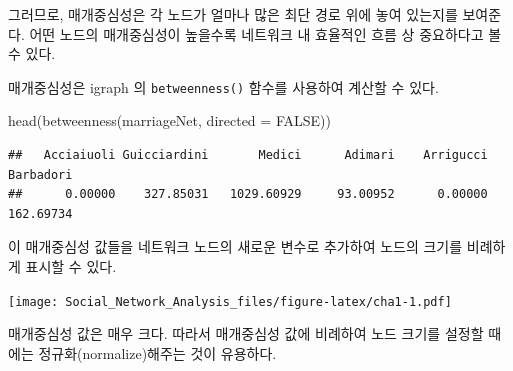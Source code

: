 \documentclass[
]{book}
\newenvironment{Shaded}{\begin{snugshade}}{\end{snugshade}}
\newcommand{\AttributeTok}[1]{\textcolor[rgb]{0.77,0.63,0.00}{#1}}
\newcommand{\CommentTok}[1]{\textcolor[rgb]{0.56,0.35,0.01}{\textit{#1}}}
\newcommand{\ConstantTok}[1]{\textcolor[rgb]{0.00,0.00,0.00}{#1}}
\newcommand{\DecValTok}[1]{\textcolor[rgb]{0.00,0.00,0.81}{#1}}
\newcommand{\FunctionTok}[1]{\textcolor[rgb]{0.00,0.00,0.00}{#1}}
\newcommand{\NormalTok}[1]{#1}
\newcommand{\OtherTok}[1]{\textcolor[rgb]{0.56,0.35,0.01}{#1}}
\newcommand{\SpecialCharTok}[1]{\textcolor[rgb]{0.00,0.00,0.00}{#1}}
\newcommand{\StringTok}[1]{\textcolor[rgb]{0.31,0.60,0.02}{#1}}
\begin{document}
그러므로, 매개중심성은 각 노드가 얼마나 많은 최단 경로 위에 놓여 있는지를 보여준다. 어떤 노드의 매개중심성이 높을수록 네트워크 내 효율적인 흐름 상 중요하다고 볼 수 있다.

매개중심성은 igraph 의 \texttt{betweenness()} 함수를 사용하여 계산할 수 있다.

\begin{Shaded}
\begin{Highlighting}[]
\FunctionTok{head}\NormalTok{(}\FunctionTok{betweenness}\NormalTok{(marriageNet, }\AttributeTok{directed =} \ConstantTok{FALSE}\NormalTok{))}
\end{Highlighting}
\end{Shaded}

\begin{verbatim}
##   Acciaiuoli Guicciardini       Medici      Adimari    Arrigucci    Barbadori 
##      0.00000    327.85031   1029.60929     93.00952      0.00000    162.69734
\end{verbatim}

이 매개중심성 값들을 네트워크 노드의 새로운 변수로 추가하여 노드의 크기를 비례하게 표시할 수 있다.

\begin{Shaded}
\end{Shaded}

\texttt{[image: Social\_Network\_Analysis\_files/figure-latex/cha1-1.pdf]}

매개중심성 값은 매우 크다. 따라서 매개중심성 값에 비례하여 노드 크기를 설정할 때에는 정규화(normalize)해주는 것이 유용하다.

\begin{Shaded}
\end{Shaded}
\end{document}
